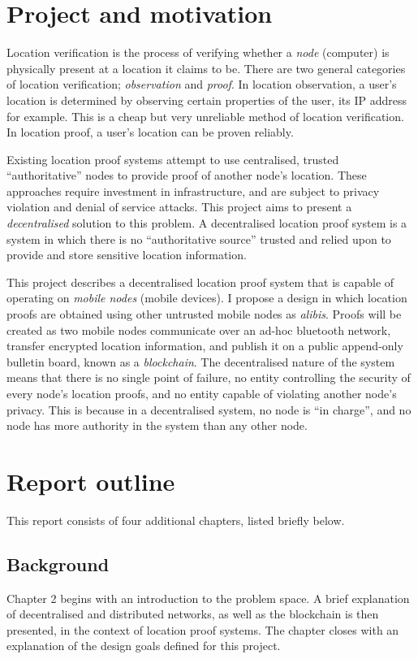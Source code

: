 \section{Project and motivation}
Location verification is the process of verifying whether a \textit{node} (computer) is physically present at a location it claims to be. There are two general categories of location verification; \textit{observation} and \textit{proof}. In location observation, a user's location is determined by observing certain properties of the user, its IP address for example. This is a cheap but very unreliable method of location verification. In location proof, a user's location can be proven reliably.

Existing location proof systems attempt to use centralised, trusted ``authoritative'' nodes to provide proof of another node's location. These approaches require investment in infrastructure, and are subject to privacy violation and denial of service attacks. This project aims to present a \textit{decentralised} solution to this problem. A decentralised location proof system is a system in which there is no ``authoritative source'' trusted and relied upon to provide and store sensitive location information.

This project describes a decentralised location proof system that is capable of operating on \textit{mobile nodes} (mobile devices). I propose a design in which location proofs are obtained using other untrusted mobile nodes as \textit{alibis}. Proofs will be created as two mobile nodes communicate over an ad-hoc bluetooth network, transfer encrypted location information, and publish it on a public append-only bulletin board, known as a \textit{blockchain}. The decentralised nature of the system means that there is no single point of failure, no entity controlling the security of every node's location proofs, and no entity capable of violating another node's privacy. This is because in a decentralised system, no node is ``in charge'', and no node has more authority in the system than any other node.

\section{Report outline}
This report consists of four additional chapters, listed briefly below.

\subsection{Background}
Chapter 2 begins with an introduction to the problem space. A brief explanation of decentralised and distributed networks, as well as the blockchain is then presented, in the context of location proof systems. The chapter closes with an explanation of the design goals defined for this project.

